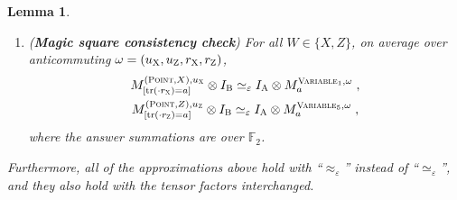 \documentclass[11pt]{article}
\newtheorem{lemma}[theorem]{Lemma}
\theoremstyle{definition}
\newcommand{\Id}{\ensuremath{I}}
\newcommand{\F}{\ensuremath{\mathbb{F}}}
\newcommand{\eps}{\varepsilon}
\DeclareMathOperator{\tr}{tr}
\newcommand{\labelstyle}[1]{\ensuremath{\textsc{#1}}\xspace}
\newcommand{\xpt}{\labelstyle{X}}
\newcommand{\zpt}{\labelstyle{Z}}
\newcommand{\alice}{\labelstyle{A}}
\newcommand{\bob}{\labelstyle{B}}
\newcommand{\typestyle}[1]{\ensuremath{\textsc{#1}}\xspace}
\newcommand{\Point}{\typestyle{Point}}
\newcommand{\Variable}{\typestyle{Variable}}
\begin{document}
\begin{lemma}
\begin{enumerate}
	\item \label{enu:qld-ms-cons} (\textbf{Magic square consistency check}) For all $W \in \{X,Z\}$, on average over anticommuting $\omega = (u_\xpt,u_\zpt,r_\xpt,r_\zpt)$,
	\begin{gather}
		M^{(\Point,X),u_\xpt}_{[\tr(\cdot r_\xpt) = a]} \otimes \Id_\bob \simeq_\eps \Id_\alice \otimes M^{\Variable_1,\omega}_{a} \;,\\
		M^{(\Point,Z),u_\zpt}_{[\tr(\cdot r_\zpt) = a]} \otimes \Id_\bob \simeq_\eps \Id_\alice \otimes M^{\Variable_5,\omega}_{a}\;,
	\end{gather}	
	where the answer summations are over $\F_2$.
	
	\end{enumerate}
	Furthermore, all of the approximations above hold with ``$\approx_\eps$'' instead of ``$\simeq_\eps$'', and they also hold with the tensor factors interchanged.
\end{lemma}
\end{document}

